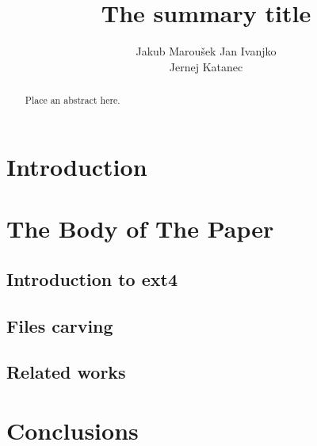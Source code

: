 \documentclass{acm_proc_article-sp}
\begin{document}
\title{The summary title}

\author{
\alignauthor
Jakub Marou\v sek
\alignauthor
Jan Ivanjko

\alignauthor
Jernej Katanec
}

\maketitle
\begin{abstract}
Place an abstract here.
\end{abstract}

\section{Introduction}

\cite{braams:babel}

\section{The {\secit Body} of The Paper}

\subsection{Introduction to ext4}

\subsection{Files carving}

\subsection{Related works}

\section{Conclusions}




\balancecolumns
\end{document}
